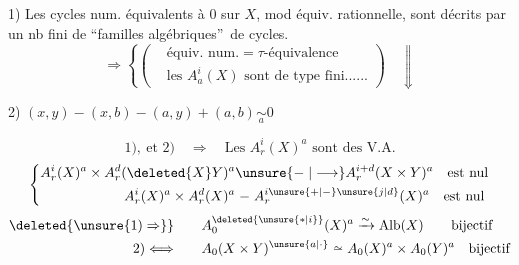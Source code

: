 1) Les cycles num. équivalents à $0$ sur $X$, mod équiv. rationnelle, sont décrits par un nb fini de \textquotedblleft familles algébriques\textquotedblright\ de cycles.
\[
\Longrightarrow\left\{\left(\begin{aligned}
&\text{équiv. num.}=\tau\text{-équivalence}\\
&\text{les } A^{i}_{a}(X)\text{ sont de type fini......}
\end{aligned}\right)\right.\quad\Downarrow
\]

2) \(\displaystyle (x,y)-(x,b)-(a,y)+(a,b)\underset{a}{\sim}0\)

\[
1),\ \text{et }2)\quad\Longrightarrow\quad\text{Les }A^{i}_{r}(X)^{a}\text{ sont des V.A.}
\]
\[
\left\{\begin{aligned}
A^{i}_{r}(X)^{a}\times A^{d}_{r}(\deleted{X}Y)^{a}&\unsure{\relbar|\longrightarrow}A^{i+d}_{r}(X\times Y)^{a}\quad\text{est nul}\\
A^{i}_{r}(X)^{a}\times A^{d}_{r}(X)^{a}&\relbar A^{i\unsure{+|-}\unsure{j|d}}_{r}(X)^{a}\quad\text{est nul}
\end{aligned}\right.
\]
\[
\begin{aligned}
\deleted{\unsure{1)\Rightarrow}}&\qquad A_{0}^{\deleted{\unsure{*|i}}}(X)^{a}\xrightarrow{\sim}\operatorname{Alb}(X)\qquad\text{bijectif}\\
2)\Longleftrightarrow&\qquad A_{0}(X\times Y)^{\unsure{a|\cdot}}\overset{\sim}{\relbar}A_{0}(X)^{a}\times A_{0}(Y)^{a}\quad\text{bijectif}
\end{aligned}
\]

